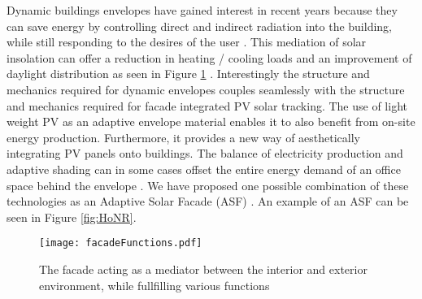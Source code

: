 Dynamic buildings envelopes have gained interest in recent years because they can save energy by controlling direct and indirect radiation into the building, while still responding to the desires of the user \cite{loonen2013climate}. This mediation of solar insolation can offer a reduction in heating / cooling loads and an improvement of daylight distribution as seen in Figure \ref{fig:ASFschematic} \cite{rossi2012adaptive}. Interestingly the structure and mechanics required for dynamic envelopes couples seamlessly with the structure and mechanics required for facade integrated PV solar tracking. The use of light weight PV as an adaptive envelope material enables it to also benefit from on-site energy production. Furthermore, it provides a new way of aesthetically integrating PV panels onto buildings. The balance of electricity production and adaptive shading can in some cases offset the entire energy demand of an office space behind the envelope \cite{jayathissa2015abs}. We have proposed one possible combination of these technologies as an Adaptive Solar Facade (ASF) \cite{nagy2015frontiers}. An example of an ASF can be seen in Figure \ref{fig:HoNR}.







\begin{figure}
\begin{center}
\texttt{[image: facadeFunctions.pdf]}
\caption{The facade acting as a mediator between the interior and exterior environment, while fullfilling various functions \cite{nagy2015frontiers}}
\label{fig:ASFschematic}
\end{center}
\end{figure}

